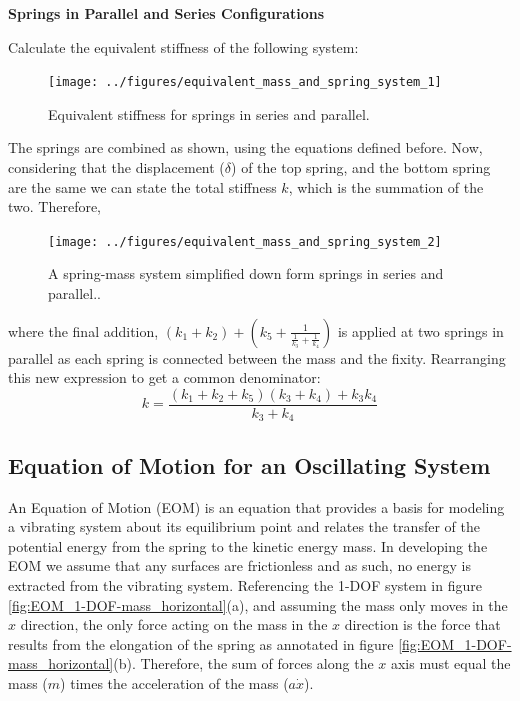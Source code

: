 \documentclass[12pt,letter]{article}
\begin{document}
			\pagebreak
			\begin{example}

			\textbf{Springs in Parallel and Series Configurations}

			\noindent Calculate the equivalent stiffness of the following system:
				\begin{figure}[H]
					\centering
					\texttt{[image: ../figures/equivalent\_mass\_and\_spring\_system\_1]}
					\caption{Equivalent stiffness for springs in series and parallel.}
				\end{figure}	
				The springs are combined as shown, using the equations defined before.  Now, considering that the displacement ($\delta$) of the top spring, and the bottom spring are the same we can state the total stiffness $k$, which is the summation of the two. Therefore,    
				\begin{figure}[H]
					\centering
					\texttt{[image: ../figures/equivalent\_mass\_and\_spring\_system\_2]}
					\caption{A spring-mass system simplified down form springs in series and parallel..}
				\end{figure}	
				\noindent where the final addition, $(k_1+k_2) + (k_5+\frac{1}{\frac{1}{k_3}+\frac{1}{k_4}})$ is applied at two springs in parallel as each spring is connected between the mass and the fixity. Rearranging this new expression to get a common denominator:
				\begin{equation}
					k= \frac{(k_1+k_2+k_5)(k_3+k_4)+k_3k_4}{k_3+k_4}  
				\end{equation}				
			\end{example}	

					
	\subsection{Equation of Motion for an Oscillating System}			
			
        An Equation of Motion (EOM) is an equation that provides a basis for modeling a vibrating system about its equilibrium point and relates the transfer of the potential energy from the spring to the kinetic energy mass. In developing the EOM we assume that any surfaces are frictionless and as such, no energy is extracted from the vibrating system. Referencing the 1-DOF system in figure \ref{fig:EOM_1-DOF-mass_horizontal}(a), and assuming the mass only moves in the $x$ direction, the only force acting on the mass in the $x$ direction is the force that results from the elongation of the spring as annotated in figure \ref{fig:EOM_1-DOF-mass_horizontal}(b). Therefore, the sum of forces along the $x$ axis must equal the mass ($m$) times the acceleration of the mass ($a\dot{x}$). 
\end{document}
